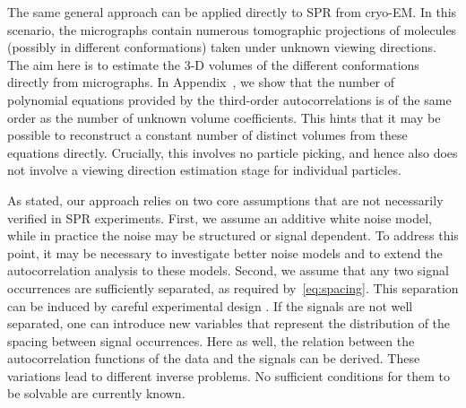 \documentclass[english,11pt]{article}
\newcommand{\1}{\mathbf{1}}
\newcommand{\TODO}[1]{{\color{red}{[#1]}}}
\numberwithin{equation}{section}
\theoremstyle{plain}
\theoremstyle{definition}
\theoremstyle{remark}
\theoremstyle{plain}
\theoremstyle{remark}
\theoremstyle{plain}
\theoremstyle{plain}
\begin{document}
The same general approach can be applied directly to SPR from cryo-EM. In this scenario, the micrographs contain numerous tomographic projections of molecules (possibly in different conformations) taken under unknown viewing directions. The aim here is to estimate the 3-D volumes of the different conformations directly from micrographs. In Appendix~\TODO{ref}, we show that the number of polynomial equations provided by the third-order autocorrelations is of the same order as the number of unknown volume coefficients. This hints that it may be possible to reconstruct a constant number of distinct volumes from these equations directly. Crucially, this involves no particle picking, and hence also does not involve a viewing direction estimation stage for individual particles. \TODO{Where and how do we cite Kam? Fred?}

\TODO{Do we want to say something about the number of images that we need? Specifically, do we want to address the fact that the numerical experiments suggest we may need a gigantic number of them for cryo, and mention trends in cryo technology that are encouraging in that regard? (Of course, we can't compare to RELION etc.\ in SNRs so low that one can't particle pick; that's not the point here.)}




As stated, our approach relies on two core assumptions that are not necessarily verified in SPR experiments.
First, we assume an additive white noise model, while in practice the noise may be structured or signal dependent. To address this point, it may be necessary to investigate better noise models and to extend the autocorrelation analysis to these models.
Second, we assume that any two signal occurrences are sufficiently separated, as required by~\eqref{eq:spacing}. 
This separation can be induced by careful experimental design \TODO{Ref?}.
If the signals are not well separated, one can introduce new variables that represent the distribution of the spacing between signal occurrences. Here as well, the relation between the autocorrelation functions of the data and the signals can be derived. These variations lead to different inverse problems. No sufficient conditions for them to be solvable are currently known.
\end{document}
